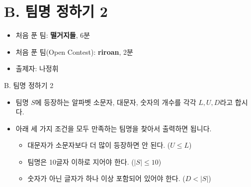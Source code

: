 \def\probno{B}
\def\probtitle{팀명 정하기 2}

\section{\probno{}. \probtitle{}}

\begin{frame} %
    \sectiontitle{\probno{}}{\probtitle{}}
    \begin{itemize}
        \item 처음 푼 팀: \textbf{떨거지들}, 6분
        \item 처음 푼 팀(Open Contest): \textbf{riroan}, 2분
        \item 출제자: 나정휘
    \end{itemize}
\end{frame}

\begin{frame}{\probno{}. \probtitle{}}
    \begin{itemize}
        \item 팀명 $S$에 등장하는 알파벳 소문자, 대문자, 숫자의 개수를 각각 $L, U, D$라고 합시다.
        \item 아래 세 가지 조건을 모두 만족하는 팀명을 찾아서 출력하면 됩니다.
        \begin{itemize}
            \item 대문자가 소문자보다 더 많이 등장하면 안 된다. ($U \le L$)
            \item 팀명은 10글자 이하로 지어야 한다. ($|S| \le 10$)
            \item 숫자가 아닌 글자가 하나 이상 포함되어 있어야 한다. ($D < |S|$)
        \end{itemize}
    \end{itemize}
\end{frame}
